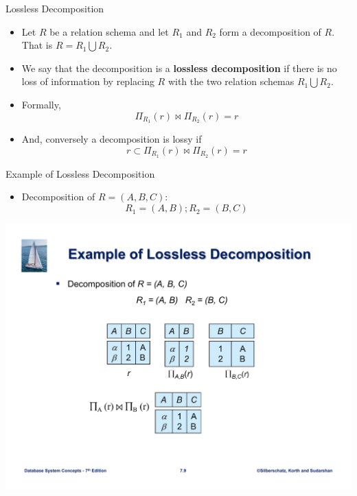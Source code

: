 \documentclass{beamer}
\begin{document}
\begin{frame}{Lossless Decomposition}
    \begin{itemize}
        \item Let $R$ be a relation schema and let $R_1$ and $R_2$ form a decomposition of $R$. That is $R = R_1 \bigcup R_2$.
        \item We say that the decomposition is a \textbf{lossless decomposition} if there is no loss of information by replacing $R$ with the two relation schemas $R_1 \bigcup R_2$.
        \item Formally,
            $$
                \Pi_{R_1}(r) \Join \Pi_{R_2}(r) = r
            $$
        \item And, conversely a decomposition is lossy if
            $$
                r \subset \Pi_{R_1}(r) \Join \Pi_{R_2}(r) = r
            $$
    \end{itemize}
\end{frame}

\begin{frame}{Example of Lossless Decomposition}
    \begin{itemize}
        \item Decomposition of $R = (A, B, C)$:
            $$
                R_1 = (A, B); R_2 = (B, C)
            $$
    \end{itemize}
    \centering
    \includegraphics[width=\textwidth, trim={3cm 2cm 3cm 8cm}, clip]{figures/slide7_loss}
\end{frame}
\end{document}
